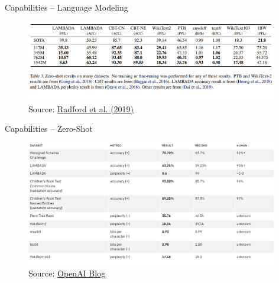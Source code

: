 
\begin{frame}{Capabilities -- Language Modeling}

\vfill

\begin{figure}
\centering
\includegraphics[width = 11cm]{figure/gpt2-lm-zeroshot.png}\\ 
\footnotesize{Source:} \href{https://cdn.openai.com/better-language-models/language_models_are_unsupervised_multitask_learners.pdf}{\footnotesize Radford et al. (2019)}
\end{figure}

\vfill

\end{frame}


\begin{frame}{Capabilities -- Zero-Shot}

\vfill

\begin{figure}
\centering
\includegraphics[width = 11cm]{figure/gpt2-zeroshot.png}\\ 
\footnotesize{Source:} \href{https://openai.com/blog/better-language-models/\#sample1}{\footnotesize OpenAI Blog}
\end{figure}

\vfill

\end{frame}

